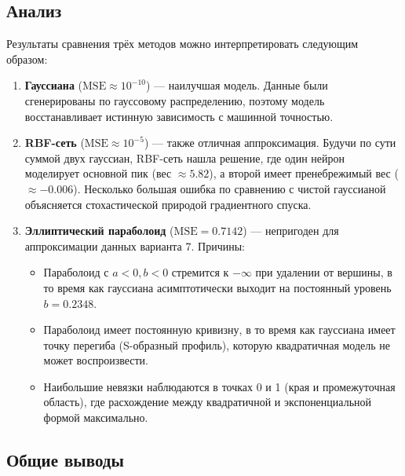 \subsection{Анализ}

Результаты сравнения трёх методов можно интерпретировать следующим образом:

\begin{enumerate}
    \item \textbf{Гауссиана} ($\text{MSE} \approx 10^{-10}$) --- наилучшая модель. Данные были сгенерированы по гауссовому распределению, поэтому модель восстанавливает истинную зависимость с машинной точностью.

    \item \textbf{RBF-сеть} ($\text{MSE} \approx 10^{-5}$) --- также отличная аппроксимация. Будучи по сути суммой двух гауссиан, RBF-сеть нашла решение, где один нейрон моделирует основной пик (вес $\approx 5.82$), а второй имеет пренебрежимый вес ($\approx -0.006$). Несколько большая ошибка по сравнению с чистой гауссианой объясняется стохастической природой градиентного спуска.

    \item \textbf{Эллиптический параболоид} ($\text{MSE} = 0.7142$) --- непригоден для аппроксимации данных варианта 7. Причины:
    \begin{itemize}
        \item Параболоид с $a < 0, b < 0$ стремится к $-\infty$ при удалении от вершины, в то время как гауссиана асимптотически выходит на постоянный уровень $b = 0.2348$.
        \item Параболоид имеет постоянную кривизну, в то время как гауссиана имеет точку перегиба (S-образный профиль), которую квадратичная модель не может воспроизвести.
        \item Наибольшие невязки наблюдаются в точках 0 и 1 (края и промежуточная область), где расхождение между квадратичной и экспоненциальной формой максимально.
    \end{itemize}
\end{enumerate}

\subsection{Общие выводы}

